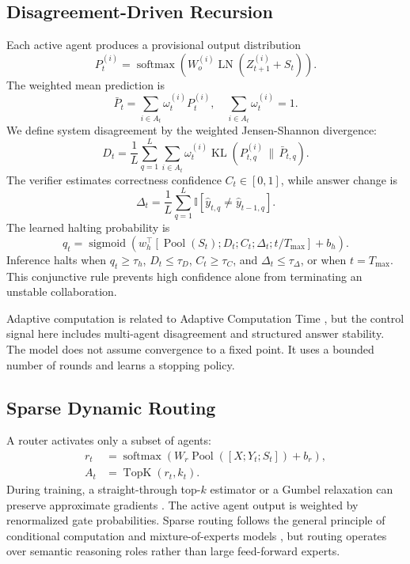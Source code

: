 \documentclass[10pt,a4paper,twocolumn]{article}
\newcommand{\KL}{\operatorname{KL}}
\newcommand{\softmax}{\operatorname{softmax}}
\newcommand{\sigmoid}{\operatorname{sigmoid}}
\newcommand{\TopK}{\operatorname{TopK}}
\newcommand{\Pool}{\operatorname{Pool}}
\newcommand{\LN}{\operatorname{LN}}
\newcommand{\Ind}{\mathbb{I}}
\begin{document}
\subsection{Disagreement-Driven Recursion}
Each active agent produces a provisional output distribution
\begin{equation}
P_t^{(i)}=\softmax\!\left(W_o^{(i)}\LN(Z_{t+1}^{(i)}+S_t)\right).
\end{equation}
The weighted mean prediction is
\begin{equation}
\bar P_t=\sum_{i\in A_t}\omega_t^{(i)}P_t^{(i)}, \quad \sum_{i\in A_t}\omega_t^{(i)}=1.
\end{equation}
We define system disagreement by the weighted Jensen-Shannon divergence:
\begin{equation}
D_t=\frac{1}{L}\sum_{q=1}^{L}\sum_{i\in A_t}\omega_t^{(i)}
\KL\!\left(P_{t,q}^{(i)}\,\|\,\bar P_{t,q}\right). \label{eq:disagreement}
\end{equation}
The verifier estimates correctness confidence $C_t\in[0,1]$, while answer change is
\begin{equation}
\Delta_t=\frac{1}{L}\sum_{q=1}^{L}\Ind[\hat y_{t,q}\neq\hat y_{t-1,q}]. \label{eq:answer_change}
\end{equation}
The learned halting probability is
\begin{equation}
q_t=\sigmoid\!\left(w_h^\top[\Pool(S_t);D_t;C_t;\Delta_t;t/T_{\max}]+b_h\right). \label{eq:halting}
\end{equation}
Inference halts when $q_t\ge\tau_h$, $D_t\le\tau_D$, $C_t\ge\tau_C$, and $\Delta_t\le\tau_\Delta$, or when $t=T_{\max}$. This conjunctive rule prevents high confidence alone from terminating an unstable collaboration.

Adaptive computation is related to Adaptive Computation Time \cite{graves2016act}, but the control signal here includes multi-agent disagreement and structured answer stability. The model does not assume convergence to a fixed point. It uses a bounded number of rounds and learns a stopping policy.

\subsection{Sparse Dynamic Routing}
A router activates only a subset of agents:
\begin{align}
r_t &= \softmax\!\left(W_r\Pool([X;Y_t;S_t])+b_r\right),\\
A_t &= \TopK(r_t,k_t). \label{eq:routing}
\end{align}
During training, a straight-through top-$k$ estimator or a Gumbel relaxation can preserve approximate gradients \cite{jang2017gumbel}. The active agent output is weighted by renormalized gate probabilities. Sparse routing follows the general principle of conditional computation and mixture-of-experts models \cite{shazeer2017moe,fedus2021switch}, but routing operates over semantic reasoning roles rather than large feed-forward experts.
\end{document}
